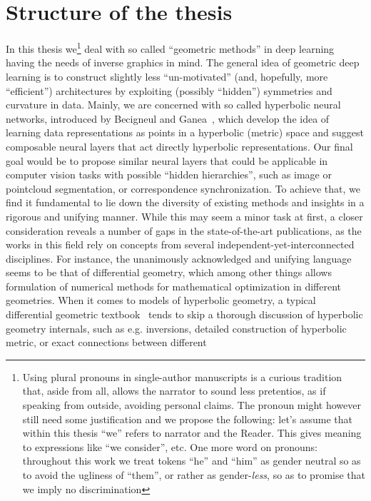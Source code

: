 \section*{Structure of the thesis}

In this thesis we\footnote{
Using plural pronouns in single-author manuscripts is a curious tradition that,
aside from all, allows the narrator to sound less pretentios, as if speaking
from outside, avoiding personal claims. The pronoun might however still need
some justification and we propose the following: let's assume that within this
thesis ``we'' refers to narrator and the Reader. This gives meaning to
expressions like ``we consider'', etc.  One more word on pronouns: throughout
this work we treat tokens ``he'' and ``him'' as gender neutral so as to avoid
the ugliness of ``them'', or rather as gender-\emph{less}, so as to promise
that we imply no discrimination}
deal with so called ``geometric methods'' in deep learning having the needs of
inverse graphics in mind. The general idea of geometric deep learning is to
construct slightly less ``un-motivated'' (and, hopefully, more ``efficient'')
architectures by exploiting (possibly ``hidden'') symmetries and curvature in
data. Mainly, we are concerned with so called hyperbolic neural networks,
introduced by Becigneul and Ganea~\cite{ganeaHNNs}, which develop the idea of
learning data representations as points in a hyperbolic (metric) space and
suggest composable neural layers that act directly hyperbolic representations.
Our final goal would be to propose similar neural layers that could be
applicable in computer vision tasks with possible ``hidden hierarchies'', such
as image or pointcloud segmentation, or correspondence synchronization. To
achieve that, we find it fundamental to lie down the diversity of existing
methods and insights in a rigorous and unifying manner. While this may seem a
minor task at first, a closer consideration reveals a number of gaps in the
state-of-the-art publications, as the works in this field rely on concepts from
several independent-yet-interconnected disciplines. For instance, the
unanimously acknowledged and unifying language seems to be that of differential
geometry, which among other things allows formulation of numerical methods for
mathematical optimization in different geometries. When it comes to models of
hyperbolic geometry, a typical differential geometric
textbook~\cite{leeRiem,leeSmooth} tends to skip a thorough discussion of
hyperbolic geometry internals, such as e.g.  inversions, detailed
construction of hyperbolic metric, or exact connections between different
